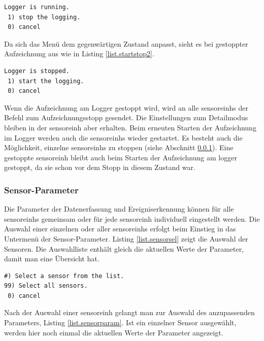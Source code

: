 \begin{lstlisting}[caption=Untermenü Stoppen der Aufzeichnung, label=list.startstop1]
 Logger is running.
 1) stop the logging.
 0) cancel
\end{lstlisting}

Da sich das Menü dem gegenwärtigen Zustand anpasst, sieht es bei gestoppter Aufzeichnung aus wie in Listing \ref{list.startstop2}.

\begin{lstlisting}[caption=Untermenü Starten der Aufzeichnung, label=list.startstop2]
 Logger is stopped.
 1) start the logging.
 0) cancel
\end{lstlisting}

Wenn die Aufzeichnung am Logger gestoppt wird, wird an alle \glspl{sensoreinh} der Befehl zum Aufzeichnungsstopp gesendet. Die Einstellungen zum Detailmodus bleiben in der \gls{sensoreinh} aber erhalten. Beim erneuten Starten der Aufzeichnung im Logger werden auch die \glspl{sensoreinh} wieder gestartet. Es besteht auch die Möglichkeit, einzelne \glspl{sensoreinh} zu stoppen (siehe Abschnitt \ref{sssec.sensorparam}). Eine gestoppte \gls{sensoreinh} bleibt auch beim Starten der Aufzeichnung am \gls{logger} gestoppt, da sie schon vor dem Stopp in diesem Zustand war.

\subsubsection{Sensor-Parameter}\label{sssec.sensorparam}
Die Parameter der Datenerfassung und Ereigniserkennung können für alle \glspl{sensoreinh} gemeinsam oder für jede \gls{sensoreinh} individuell eingestellt werden. Die Auswahl einer einzelnen oder aller \glspl{sensoreinh} erfolgt beim Einstieg in das Untermenü der Sensor-Parameter. Listing \ref{list.sensorsel} zeigt die Auswahl der Sensoren. Die Auswahlliste enthält gleich die aktuellen Werte der Parameter, damit man eine Übersicht hat.


\begin{lstlisting}[caption=Untermenü Sensor-Auswahl, label=list.sensorsel]
 #) Select a sensor from the list.
99) Select all sensors.
 0) cancel
\end{lstlisting}

Nach der Auswahl einer \gls{sensoreinh} gelangt man zur Auswahl des anzupassenden Parameters, Listing \ref{list.sensorparam}. Ist ein einzelner Sensor ausgewählt, werden hier noch einmal die aktuellen Werte der Parameter angezeigt.

